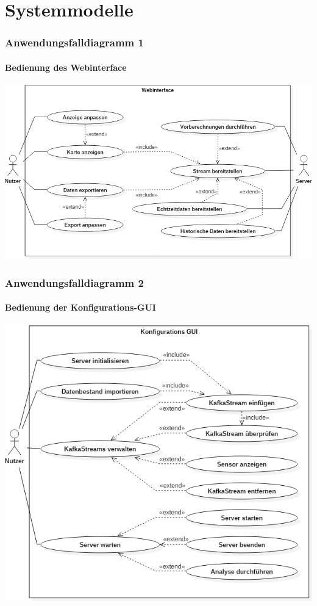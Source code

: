 \documentclass{beamer}
\begin{document}
\section{Systemmodelle}

\begin{frame}
	\frametitle{Anwendungsfalldiagramm 1}
	\framesubtitle{Bedienung des Webinterface}
	\centering
	\includegraphics[width=\linewidth]{diagrams/UseCaseDiagram1}
\end{frame}

\begin{frame}
	\frametitle{Anwendungsfalldiagramm 2}
	\framesubtitle{Bedienung der Konfigurations-GUI}
	\centering
	\includegraphics[width=0.8\linewidth]{diagrams/UseCaseDiagram2}
\end{frame}
\end{document}
